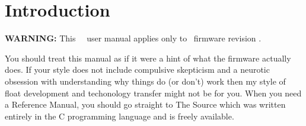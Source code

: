 %
%
%

\section{Introduction}

\textbf{WARNING:} This \iridium\ \apex\ user manual applies only to \apf\ 
firmware revision \fwrev.  

You should treat this manual as if it were a hint of what the firmware
actually does.  If your style does not include compulsive skepticism and a
neurotic obsession with understanding why things do (or don't) work then my
style of float development and techonology transfer might not be for you.
When you need a Reference Manual, you should go straight to The Source which
was written entirely in the C programming language and is freely available.  

